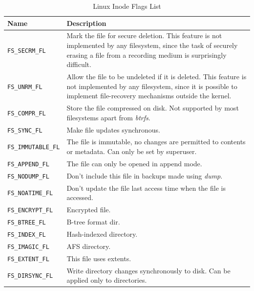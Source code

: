 \documentclass[a4paper]{article}
\begin{document}
\begin{table}
\renewcommand{\arraystretch}{1.25}
\centering\caption{Linux Inode Flags List}\label{tbl:iflags}
\begin{tabular}{@{}lp{8cm}@{}}
\toprule
Name & Description\\
\midrule
\verb|FS_SECRM_FL|
& Mark the file for secure deletion.  This feature is not implemented by any filesystem, since the task of securely erasing a file from a recording medium is surprisingly difficult.\\

\verb|FS_UNRM_FL|
& Allow the file to be undeleted if it is deleted.  This feature is not implemented by any filesystem, since it is possible to implement file-recovery mechanisms outside the kernel.\\

\verb|FS_COMPR_FL|
& Store the file compressed on disk. Not supported by most filesystems apart from \emph{btrfs}.\\

\verb|FS_SYNC_FL|
& Make  file updates synchronous.\\

\verb|FS_IMMUTABLE_FL|
& The file is immutable, no changes are permitted to contents or metadata. Can only be set by superuser.\\

\verb|FS_APPEND_FL|
& The file can only be opened in append mode.\\

\verb|FS_NODUMP_FL|
& Don't include this file in backups made using \emph{dump}.\\

\verb|FS_NOATIME_FL|
& Don't  update  the  file  last access time when the file is accessed.\\

\verb|FS_ENCRYPT_FL|
& Encrypted file.\\

\verb|FS_BTREE_FL|
& B-tree format dir.\\

\verb|FS_INDEX_FL|
& Hash-indexed directory.\\

\verb|FS_IMAGIC_FL|
& AFS directory.\\

\verb|FS_EXTENT_FL|
& This file uses extents.\\

\verb|FS_DIRSYNC_FL|
& Write directory changes synchronously to disk. Can be applied only to directories.\\


\end{tabular}
\end{table}
\end{document}
